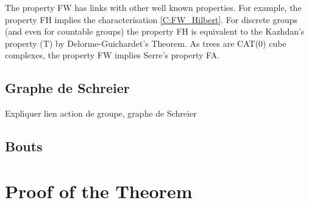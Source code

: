 \documentclass[a4paper]{article}
\theoremstyle{remark}%
\begin{document}
The property FW has links with other well known properties. For example, the property FH implies the characterisation \ref{C:FW_Hilbert}. For discrete groups (and even for countable groups) the property FH is equivalent to the Kazhdan's property (T) by Delorme-Guichardet's Theorem. As trees are CAT(0) cube complexes, the property FW implies Serre's property FA. %
%
%
\subsection{Graphe de Schreier}
Expliquer lien action de groupe, graphe de Schreier
%
%
%
\subsection{Bouts}
%
%
\section{Proof of the Theorem}
\
\end{document}
